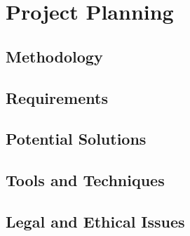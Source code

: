 \chapter[Project Planning]{Project Planning}

\section{Methodology}

\section{Requirements}

\section{Potential Solutions}

\section{Tools and Techniques}

\section{Legal and Ethical Issues}